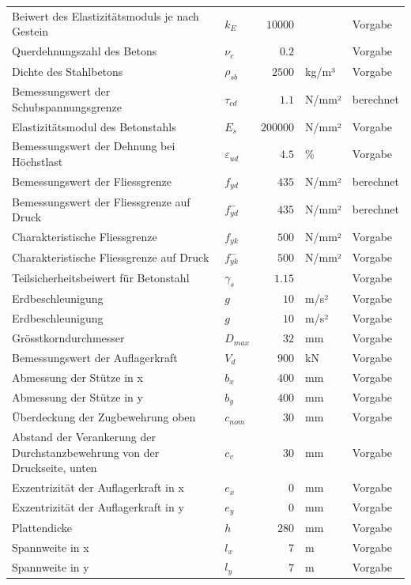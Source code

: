 \documentclass[11pt,a4paper]{article}
\begin{document}
\begin{xltabular}{\linewidth}{>{\raggedright\arraybackslash}Xlrll}
Beiwert des Elastizitätsmoduls je nach Gestein & $k_E$ & $10000$ &  & Vorgabe \\
Querdehnungszahl des Betons & $\nu_c$ & $0.2$ &  & Vorgabe \\
Dichte des Stahlbetons & $\rho_{sb}$ & $2500$ & kg/m³ & Vorgabe \\
Bemessungswert der Schubspannungsgrenze & $\tau_{cd}$ & $1.1$ & N/mm² & berechnet \\
Elastizitätsmodul des Betonstahls & $E_s$ & $200000$ & N/mm² & Vorgabe \\
Bemessungswert der Dehnung bei Höchstlast & $\varepsilon_{ud}$ & $4.5$ & \% & Vorgabe \\
Bemessungswert der Fliessgrenze & $f_{yd}$ & $435$ & N/mm² & berechnet \\
Bemessungswert der Fliessgrenze auf Druck & $f_{yd}^{-}$ & $435$ & N/mm² & berechnet \\
Charakteristische Fliessgrenze & $f_{yk}$ & $500$ & N/mm² & Vorgabe \\
Charakteristische Fliessgrenze auf Druck & $f_{yk}^{-}$ & $500$ & N/mm² & Vorgabe \\
Teilsicherheitsbeiwert für Betonstahl & $\gamma_s$ & $1.15$ &  & Vorgabe \\
Erdbeschleunigung & $g$ & $10$ & m/s² & Vorgabe \\
Erdbeschleunigung & $g$ & $10$ & m/s² & Vorgabe \\
Grösstkorndurchmesser & $D_{max}$ & $32$ & mm & Vorgabe \\
Bemessungswert der Auflagerkraft & $V_d$ & $900$ & kN & Vorgabe \\
Abmessung der Stütze in x & $b_x$ & $400$ & mm & Vorgabe \\
Abmessung der Stütze in y & $b_y$ & $400$ & mm & Vorgabe \\
Überdeckung der Zugbewehrung oben & $c_{nom}$ & $30$ & mm & Vorgabe \\
Abstand der Verankerung der Durchstanzbewehrung von der Druckseite, unten & $c_v$ & $30$ & mm & Vorgabe \\
Exzentrizität der Auflagerkraft in x & $e_x$ & $0$ & mm & Vorgabe \\
Exzentrizität der Auflagerkraft in y & $e_y$ & $0$ & mm & Vorgabe \\
Plattendicke & $h$ & $280$ & mm & Vorgabe \\
Spannweite in x & $l_x$ & $7$ & m & Vorgabe \\
Spannweite in y & $l_y$ & $7$ & m & Vorgabe \\

\end{xltabular}
\end{document}
